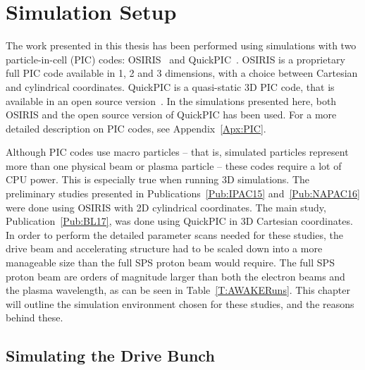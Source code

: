 %
%

\chapter{Simulation Setup}
\label{Ch:SimS}

The work presented in this thesis has been performed using simulations with two particle-in-cell (PIC) codes:
OSIRIS~\cite{fonseca:2002} and QuickPIC~\cite{an:2013, huang:2006}.
OSIRIS is a proprietary full PIC code available in 1, 2 and 3 dimensions, with a choice between Cartesian and cylindrical coordinates.
QuickPIC is a quasi-static 3D PIC code, that is available in an open source version~\cite{add:quickpic:web}.
In the simulations presented here, both OSIRIS and the open source version of QuickPIC has been used.
For a more detailed description on PIC codes, see Appendix~\ref{Apx:PIC}.

Although PIC codes use macro particles -- that is, simulated particles represent more than one physical beam or plasma particle -- these codes require a lot of CPU power.
This is especially true when running 3D simulations.
The preliminary studies presented in Publications~\ref{Pub:IPAC15} and~\ref{Pub:NAPAC16} were done using OSIRIS with 2D cylindrical coordinates.
The main study, Publication~\ref{Pub:BL17}, was done using QuickPIC in 3D Cartesian coordinates.
In order to perform the detailed parameter scans needed for these studies, the drive beam and accelerating structure had to be scaled down into a more manageable size than the full SPS proton beam would require.
The full SPS proton beam are orders of magnitude larger than both the electron beams and the plasma wavelength, as can be seen in Table~\ref{T:AWAKERuns}.
This chapter will outline the simulation environment chosen for these studies, and the reasons behind these.

\section{Simulating the Drive Bunch}
\label{Sim:PBeam}

